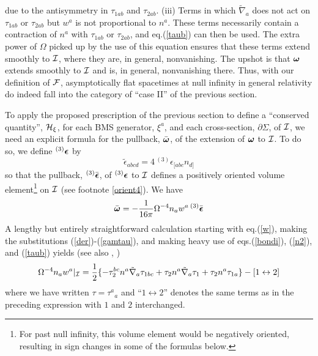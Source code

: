 due to the antisymmetry in $\tau_{1ab}$ and $\tau_{2ab}$. (iii) Terms
in which $\tilde{\nabla}_a$ does not act on $\tau_{1ab}$ or
$\tau_{2ab}$ but $w^a$ is not proportional to $n^a$. These terms
necessarily contain a contraction of $n^a$ with $\tau_{1ab}$ or
$\tau_{2ab}$, and eq.(\ref{taub}) can then be used. The extra power of
$\Omega$ picked up by the use of this equation ensures that these
terms extend smoothly to ${\cal I}$, where they are, in general,
nonvanishing. The upshot is that ${\mbox{\boldmath $\omega$}}$ extends
smoothly to ${\cal I}$ and is, in general, nonvanishing there. Thus,
with our definition of $\cal F$, asymptotically flat spacetimes at
null infinity in general relativity do indeed fall into the category
of ``case II'' of the previous section.

To apply the proposed prescription of the previous section to define a
``conserved quantity'', ${\cal H}_\xi$, for each BMS generator, $\xi^a$, and
each cross-section, $\partial \Sigma$, of ${\cal I}$, we need an
explicit formula for the pullback, $\bar{\mbox{\boldmath $\omega$}}$,
of the extension of ${\mbox{\boldmath $\omega$}}$ to ${\cal I}$. To do
so, we define ${}^{(3)} {\mbox{\boldmath $\epsilon$}}$ by
\begin{equation}
\tilde{\epsilon}_{abcd} = 4 \, {}^{(3)} \epsilon_{[abc} n_{d]}
\label{3eps}
\end{equation}
so that the pullback, ${}^{(3)} \bar{\mbox{\boldmath $\epsilon$}}$, of
${}^{(3)} {\mbox{\boldmath $\epsilon$}}$ to ${\cal I}$ defines a
positively oriented volume element\footnote{For past null infinity,
this volume element would be negatively oriented, resulting in sign
changes in some of the formulas below.} on ${\cal I}$ (see footnote
\ref{orient4}). We have
\begin{equation}
\bar{\mbox{\boldmath $\omega$}} = - \frac{1}{16 \pi} \Omega^{-4} n_a
w^a \, {}^{(3)} \bar{\mbox{\boldmath $\epsilon$}}
\label{omegabar}
\end{equation}
A lengthy but entirely straightforward calculation starting with
eq.(\ref{w}), making the substitutions (\ref{der})-(\ref{gamtau}), and
making heavy use of eqs.(\ref{bondi}), (\ref{n2}), and (\ref{taub})
yields (see also \cite{am}, \cite{abr})
\begin{equation}
\Omega^{-4} n_a w^a|_{\cal I} = \frac{1}{2} \{ - \tau_{2}^{bc} n^a
\tilde{\nabla}_a \tau_{1bc} + \tau_2 n^a \tilde{\nabla}_a \tau_1
+ \tau_2 n^a \tau_{1a} \} - [1 \leftrightarrow 2]
\label{omegascri}
\end{equation}
where we have written $\tau = {\tau^a}_a$ and ``$1 \leftrightarrow
2$'' denotes the same terms as in the preceding expression with $1$
and $2$ interchanged.

